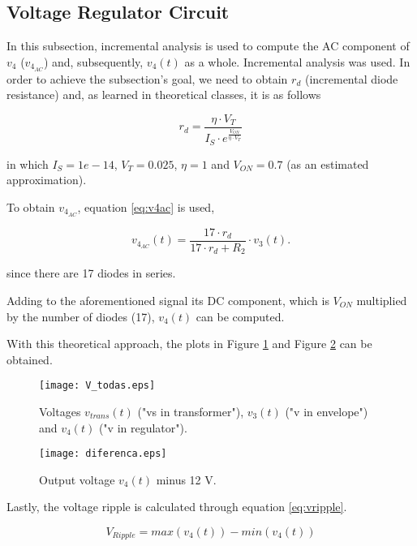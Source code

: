 \subsection{Voltage Regulator Circuit}
\label{subsec:theo_vr}

In this subsection, incremental analysis is used to compute the AC component of $v_4$ ($v_{4_{AC}}$) and, subsequently, $v_4(t)$ as a whole. Incremental analysis was used. In order to achieve the subsection's goal, we need to obtain $r_d$ (incremental diode resistance) and, as learned in theoretical classes, it is as follows

\begin{equation}
    r_d = \frac{\eta \cdot V_T}{I_S \cdot e^{\frac{V_{ON}}{\eta \cdot V_T}}}
    \label{eq:rd}
\end{equation}

in which $I_S=1e-14$, $V_T=0.025$, $\eta = 1$ and $V_{ON}=0.7$ (as an estimated approximation).

To obtain $v_{4_{AC}}$, equation \ref{eq:v4ac} is used,

\begin{equation}
    v_{4_{AC}}(t) = \frac{17 \cdot r_d}{17 \cdot r_d + R_2} \cdot v_3(t).
    \label{eq:v4ac}
\end{equation}

since there are 17 diodes in series.

Adding to the aforementioned signal its DC component, which is $V_{ON}$ multiplied by the number of diodes (17), $v_4(t)$ can be computed.

With this theoretical approach, the plots in Figure \ref{plot:todas} and Figure \ref{plot:diferenca} can be obtained. 


\begin{figure}[h]
\centering
\texttt{[image: V\_todas.eps]}
\caption{Voltages $v_{trans}(t)$ ("vs in transformer"), $v_3(t)$ ("v in envelope") and $v_4(t)$ ("v in regulator").}
\label{plot:todas}
\end{figure}

\begin{figure}[h]
\centering
\texttt{[image: diferenca.eps]}
\caption{Output voltage $v_4(t)$ minus 12 V.}
\label{plot:diferenca}
\end{figure}

\clearpage


Lastly, the voltage ripple is calculated through equation \ref{eq:vripple}.

\begin{equation}
    V_{Ripple} = max(v_4(t)) - min(v_4(t))
    \label{eq:vripple}
\end{equation}

